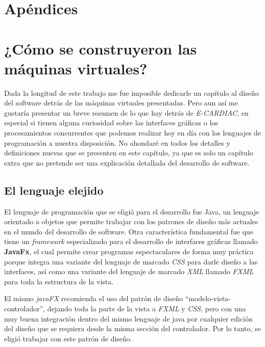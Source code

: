 \documentclass[letterpaper,12pt,oneside]{book}
\begin{document}


\newpage

\newpage
\appendix  %

\chapter*{Apéndices} %
\thispagestyle{empty}
\newpage


\chapter{¿Cómo se construyeron las máquinas virtuales?}


	Dada la longitud de este trabajo me fue imposible dedicarle un capítulo al diseño del software detrás de las máquinas virtuales
	presentadas. Pero aun así me gustaría presentar un breve resumen de lo que hay detrás de \textit{E-CARDIAC}, en especial si tienen
	alguna curiosidad sobre las interfaces gráficas o los procesamientos concurrentes que podemos realizar hoy en día con los lenguajes
	de programación a nuestra disposición. No ahondaré en todos los detalles y definiciones nuevas que se presenten en este capítulo, ya que
	es solo un capítulo extra que no pretende ser una explicación detallada del desarrollo de software.
	
	\section{El lenguaje elejido}
	
	El lenguaje de programación que se eligió para el desarrollo fue Java, un lenguaje orientado a objetos que permite trabajar con
	los patrones de diseño más actuales en el mundo del desarrollo de software. Otra característica fundamental fue que tiene un \textit{framework} 
	especializado para el desarrollo de interfaces gráficas llamado \textbf{JavaFx}, el cual permite crear programas espectaculares
	de forma muy práctica porque integra una variante del lenguaje de marcado \textit{CSS}  para darle diseño a las interfaces, así como una variante
	del lenguaje de marcado \textit{XML} llamado \textit{FXML} para toda la estructura de la vista.
	
	El mismo \textit{javaFX} recomienda el uso del patrón de diseño ``modelo-vista-controlador'', dejando toda la parte de la vista a \textit{FXML} y \textit{CSS},
	pero con una muy buena integración dentro del mismo lenguaje de java por cualquier edición del diseño que se requiera desde la misma sección
	del controlador. Por lo tanto, se eligió trabajar con este patrón de diseño.
	
\end{document}
